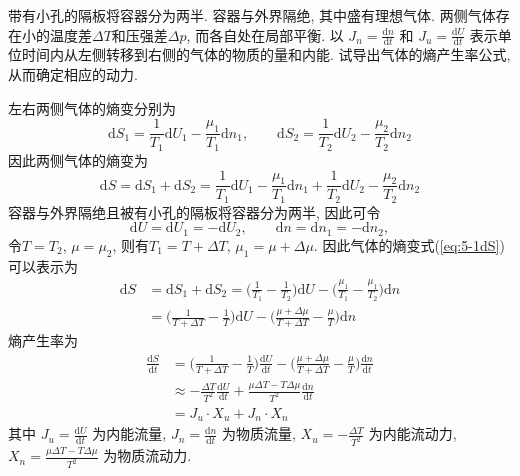 \begin{problem}[5.1]
带有小孔的隔板将容器分为两半. 容器与外界隔绝, 其中盛有理想气体. 两侧气体存在小的温度差$\Delta T$和压强差$\Delta p$, 而各自处在局部平衡. 以
$J_n = \frac{\mathrm{d}n}{\mathrm{d}t}$ 和 $J_u = \frac{\mathrm{d}U}{\mathrm{d}t}$ 表示单位时间内从左侧转移到右侧的气体的物质的量和内能. 试导出气体的熵产生率公式, 从而确定相应的动力.
\end{problem}
\begin{solution}
左右两侧气体的熵变分别为
\[
\mathrm{d}S_{1}  =\frac{1}{T_{1}}\mathrm{d}U_{1}-\frac{\mu_{1}}{T_{1}}\mathrm{d}n_{1},\qquad
\mathrm{d}S_{2}  =\frac{1}{T_{2}}\mathrm{d}U_{2}-\frac{\mu_{2}}{T_{2}}\mathrm{d}n_{2}
\]
因此两侧气体的熵变为
\begin{equation}\label{eq:5-1dS}
\mathrm{d}S 
= \mathrm{d}S_1 + \mathrm{d}S_2 
= \frac{1}{T_{1}}\mathrm{d}U_{1}-\frac{\mu_{1}}{T_{1}}\mathrm{d}n_{1} 
+ \frac{1}{T_{2}}\mathrm{d}U_{2}-\frac{\mu_{2}}{T_{2}}\mathrm{d}n_{2}
\end{equation}
容器与外界隔绝且被有小孔的隔板将容器分为两半, 因此可令
\[
\mathrm{d}U  = \mathrm{d}U_1 =- \mathrm{d}U_2,
\qquad 
\mathrm{d}n  = \mathrm{d}n_1 =- \mathrm{d}n_2,
\]
令$T = T_2$, $\mu = \mu_2$, 则有$T_1 = T + \Delta T$, $\mu_1 = \mu + \Delta\mu$. 因此气体的熵变式(\ref{eq:5-1dS})可以表示为
\begin{align*}
\mathrm{d}S & =\mathrm{d}S_{1}+\mathrm{d}S_{2}=\bigg(\frac{1}{T_{1}}-\frac{1}{T_{2}}\bigg)\mathrm{d}U-\bigg(\frac{\mu_{1}}{T_{1}}-\frac{\mu_{1}}{T_{2}}\bigg)\mathrm{d}n\\
 & =\bigg(\frac{1}{T+\Delta T}-\frac{1}{T}\bigg)\mathrm{d}U-\bigg(\frac{\mu+\Delta\mu}{T+\Delta T}-\frac{\mu}{T}\bigg)\mathrm{d}n
\end{align*}
熵产生率为
\begin{align*}
\frac{\mathrm{d}S}{\mathrm{d}t} 
 &=\bigg(\frac{1}{T+\Delta T}-\frac{1}{T}\bigg)\frac{\mathrm{d}U}{\mathrm{d}t}-\bigg(\frac{\mu+\Delta\mu}{T+\Delta T}-\frac{\mu}{T}\bigg)\frac{\mathrm{d}n}{\mathrm{d}t}\\
 &\approx - \frac{\Delta T}{T^2}\frac{\mathrm{d}U}{\mathrm{d}t} + \frac{\mu\Delta T - T\Delta\mu}{T^2}\frac{\mathrm{d}n}{\mathrm{d}t}\\
 &= J_u\cdot X_u + J_n\cdot X_n
\end{align*}
其中 $J_u = \frac{\mathrm{d}U}{\mathrm{d}t}$ 为内能流量, $J_n = \frac{\mathrm{d}n}{\mathrm{d}t}$ 为物质流量,  $X_u = - \frac{\Delta T}{T^2}$ 为内能流动力, $X_n = \frac{\mu\Delta T - T\Delta\mu}{T^2}$ 为物质流动力.
\end{solution}
